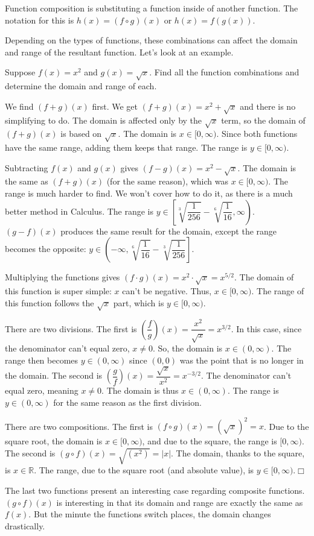 \documentclass[lang=en,11pt]{elegantbook}
\begin{document}
Function composition is substituting a function inside of another function.  The notation for this is $h(x)=(f\circ g)(x)$ or $h(x)=f\left(g(x)\right)$.

Depending on the types of functions, these combinations can affect the domain and range of the resultant function.  Let's look at an example.
\begin{example}
Suppose $f(x)=x^2$ and $g(x)=\sqrt{x}$.  Find all the function combinations and determine the domain and range of each.
\end{example}
\begin{solution}
We find $(f+g)(x)$ first.  We get $(f+g)(x)=x^2+\sqrt{x}$ and there is no simplifying to do.  The domain is affected only by the $\sqrt{x}$ term, so the domain of $(f+g)(x)$ is based on $\sqrt{x}$.  The domain is $x\in[0,\infty)$.  Since both functions have the same range, adding them keeps that range.  The range is $y\in[0,\infty)$.

Subtracting $f(x)$ and $g(x)$ gives $(f-g)(x)=x^2-\sqrt{x}$.  The domain is the same as $(f+g)(x)$ (for the same reason), which was $x\in[0,\infty)$.  The range is much harder to find.  We won't cover how to do it, as there is a much better method in Calculus.  The range is $y\in\left[\sqrt[3]{\dfrac{1}{256}}-\sqrt[6]{\dfrac{1}{16}},\infty\right)$.  $(g-f)(x)$ produces the same result for the domain, except the range becomes the opposite: $y\in\left(-\infty,\sqrt[6]{\dfrac{1}{16}}-\sqrt[3]{\dfrac{1}{256}}\right]$.

Multiplying the functions gives $(f\cdot g)(x)=x^2\cdot \sqrt{x}=x^{5/2}$.  The domain of this function is super simple: $x$ can't be negative.  Thus, $x\in[0,\infty)$.  The range of this function follows the $\sqrt{x}$ part, which is $y\in[0,\infty)$.

There are two divisions.  The first is $\left(\dfrac{f}{g}\right)(x)=\dfrac{x^2}{\sqrt{x}}=x^{3/2}$.  In this case, since the denominator can't equal zero, $x\neq 0$.  So, the domain is $x\in(0,\infty)$.  The range then becomes $y\in(0,\infty)$ since $(0,0)$ was the point that is no longer in the domain.  The second is $\left(\dfrac{g}{f}\right)(x)=\dfrac{\sqrt{x}}{x^2}=x^{-3/2}$.  The denominator can't equal zero, meaning $x\neq 0$.  The domain is thus $x\in(0,\infty)$.  The range is $y\in(0,\infty)$ for the same reason as the first division.  

There are two compositions.  The first is $(f\circ g)(x)=\left(\sqrt{x}\right)^2=x$.  Due to the square root, the domain is $x\in[0,\infty)$, and due to the square, the range is $[0,\infty)$.  The second is $(g\circ f)(x)=\sqrt{\left(x^2\right)}=|x|$.  The domain, thanks to the square, is $x\in\mathbb{R}$.  The range, due to the square root (and absolute value), is $y\in[0,\infty)$.$\Box$
\end{solution}
The last two functions present an interesting case regarding composite functions.  $(g\circ f)(x)$ is interesting in that its domain and range are exactly the same as $f(x)$.  But the minute the functions switch places, the domain changes drastically.  
\end{document}
